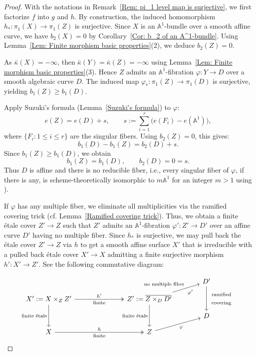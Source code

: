 \documentclass[12pt,reqno,twoside]{amsart}
\theoremstyle{definition}
\numberwithin{equation}{section}
\newcommand{\A}{\mathbb{A}}
\newcommand{\Kbar}{\bar{\kappa}}
\begin{document}
\begin{proof}
With the notations in Remark~\ref{Rem: pi_1 level map is surjective}, we first factorize $f$ into $g$ and $h$.
By construction, the induced homomorphism $h_\ast : \pi_1(X) \to \pi_1(Z)$ is surjective. Since $X$ is an $\A^1$-bundle over a smooth affine curve, we have $b_2(X)=0$ by Corollary~\ref{Cor: b_2 of an A^1-bundle}. Using Lemma~\ref{Lem: Finite morphism basic properties}(2), we deduce $b_2(Z)=0$.

As $\Kbar(X) = -\infty$, then $\Kbar(Y) = \Kbar(Z) = -\infty$ using Lemma~\ref{Lem: Finite morphism basic properties}(3). Hence $Z$ admits an $\A^1$-fibration $\varphi : Y \to D$ over a smooth algebraic curve $D$. The induced map $\varphi_\ast : \pi_1(Z) \to \pi_1(D)$ is surjective, yielding $b_1(Z) \ge b_1(D)$.

Apply Suzuki’s formula (Lemma~\ref{Suzuki's formula}) to $\varphi$:
\[
e(Z) = e(D) + s,\qquad 
s := \sum_{i=1}^{r}\bigl(e(F_i)-e(\A^1)\bigr),
\]
where $\{F_i: 1\leq i\leq r\}$ are the singular fibers. Using $b_2(Z)=0$, this gives:
\[
b_1(D) - b_1(Z) = b_2(D) + s.
\]
Since $b_1(Z) \ge b_1(D)$, we obtain
\[
b_1(Z)=b_1(D), \qquad b_2(D)=0=s.
\]
Thus $D$ is affine and there is no reducible fiber, i.e., every singular fiber of $\varphi$, if there is any, is scheme-theoretically isomorphic to $m\A^1$ for an integer $m>1$ using \cite[Chapter I, Lemma 4.4]{Miy1981}).

If $\varphi$ has any multiple fiber, we eliminate all multiplicities via the ramified covering trick (cf. Lemma~\ref{Ramified covering trick}). Thus, we obtain a finite {\'e}tale cover $Z' \to Z$ such that $Z'$ admits an $\A^1$-fibration $\varphi' : Z' \to D'$ over an affine curve $D'$ having no multiple fiber. Since $h_\ast$ is surjective, we may pull back the {\'e}tale cover $Z'\to Z$ via $h$ to get a smooth affine surface $X'$ that is irreducible with a pulled back {\'e}tale cover $X'\to X$ admitting a finite surjective morphism $h' : X' \to Z'$. See the following commutative diagram:

\[\begin{tikzcd}[row sep=small, column sep=large]
	&&& {D'} \\
	{X':=X\times_{Z}Z'} && {Z':=\overline{Z\times_{D}D'}} \\
	&&& D \\
	X && Z
	\arrow["\begin{array}{c} \text{ramified}\\\text{covering} \end{array}", from=1-4, to=3-4]
	\arrow["{h'}", two heads, "\text{finite}"', from=2-1, to=2-3]
	\arrow["\text{finite {\'e}tale}"', from=2-1, to=4-1]
	\arrow["\varphi'"', "\text{no multiple fiber}", from=2-3, to=1-4]
	\arrow["\text{finite {\'e}tale}"', from=2-3, to=4-3]
	\arrow["h", two heads, "\text{finite}"', from=4-1, to=4-3]
	\arrow["\varphi"', from=4-3, to=3-4]
\end{tikzcd}\]


\end{proof}
\end{document}
